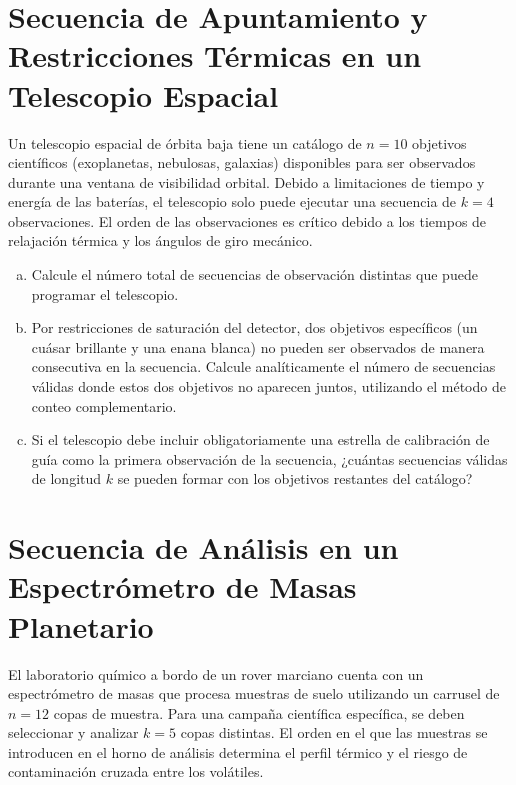 \documentclass[a4paper]{article}
\begin{document}
\section{Secuencia de Apuntamiento y Restricciones Térmicas en un Telescopio Espacial}
\label{sec:problema-27}

Un telescopio espacial de órbita baja tiene un catálogo de $n = 10$ objetivos científicos (exoplanetas, nebulosas, galaxias) disponibles para ser observados durante una ventana de visibilidad orbital. Debido a limitaciones de tiempo y energía de las baterías, el telescopio solo puede ejecutar una secuencia de $k = 4$ observaciones. El orden de las observaciones es crítico debido a los tiempos de relajación térmica y los ángulos de giro mecánico.

\begin{enumerate}[a)]
\item Calcule el número total de secuencias de observación distintas que puede programar el telescopio.
\item Por restricciones de saturación del detector, dos objetivos específicos (un cuásar brillante y una enana blanca) no pueden ser observados de manera consecutiva en la secuencia. Calcule analíticamente el número de secuencias válidas donde estos dos objetivos no aparecen juntos, utilizando el método de conteo complementario.
\item Si el telescopio debe incluir obligatoriamente una estrella de calibración de guía como la primera observación de la secuencia, ¿cuántas secuencias válidas de longitud $k$ se pueden formar con los objetivos restantes del catálogo?
\end{enumerate}

\section{Secuencia de Análisis en un Espectrómetro de Masas Planetario}
\label{sec:problema-28}

El laboratorio químico a bordo de un rover marciano cuenta con un espectrómetro de masas que procesa muestras de suelo utilizando un carrusel de $n = 12$ copas de muestra. Para una campaña científica específica, se deben seleccionar y analizar $k = 5$ copas distintas. El orden en el que las muestras se introducen en el horno de análisis determina el perfil térmico y el riesgo de contaminación cruzada entre los volátiles.
\end{document}
